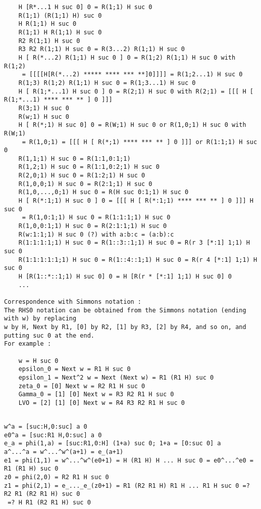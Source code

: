 \documentclass[10pt]{article}
\begin{document}
\begin{verbatim}
    H [R*...1 H suc 0] 0 = R(1;1) H suc 0
    R(1;1) (R(1;1) H) suc 0
    H R(1;1) H suc 0
    R(1;1) H R(1;1) H suc 0
    R2 R(1;1) H suc 0
    R3 R2 R(1;1) H suc 0 = R(3...2) R(1;1) H suc 0
    H [ R(*...2) R(1;1) H suc 0 ] 0 = R(1;2) R(1;1) H suc 0 with R(1;2) 
     = [[[[H[R(*...2) ***** **** *** **]0]]]] = R(1;2...1) H suc 0
    R(1;3) R(1;2) R(1;1) H suc 0 = R(1;3...1) H suc 0
    H [ R(1;*...1) H suc 0 ] 0 = R(2;1) H suc 0 with R(2;1) = [[[ H [ R(1;*...1) **** *** ** ] 0 ]]]
    R(3;1) H suc 0
    R(w;1) H suc 0
    H [ R(*;1) H suc 0] 0 = R(W;1) H suc 0 or R(1,0;1) H suc 0 with R(W;1) 
     = R(1,0;1) = [[[ H [ R(*;1) **** *** ** ] 0 ]]] or R(1:1;1) H suc 0
    R(1,1;1) H suc 0 = R(1:1,0:1;1)
    R(1,2;1) H suc 0 = R(1:1,0:2;1) H suc 0
    R(2,0;1) H suc 0 = R(1:2;1) H suc 0
    R(1,0,0;1) H suc 0 = R(2:1;1) H suc 0
    R(1,0,...,0;1) H suc 0 = R(H suc 0:1;1) H suc 0
    H [ R(*:1;1) H suc 0 ] 0 = [[[ H [ R(*:1;1) **** *** ** ] 0 ]]] H suc 0 
     = R(1,0:1;1) H suc 0 = R(1:1:1;1) H suc 0
    R(1,0,0:1;1) H suc 0 = R(2:1:1;1) H suc 0
    R(w:1:1;1) H suc 0 (?) with a:b:c = (a:b):c
    R(1:1:1:1;1) H suc 0 = R(1::3::1;1) H suc 0 = R(r 3 [*:1] 1;1) H suc 0
    R(1:1:1:1:1;1) H suc 0 = R(1::4::1;1) H suc 0 = R(r 4 [*:1] 1;1) H suc 0
    H [R(1::*::1;1) H suc 0] 0 = H [R(r * [*:1] 1;1) H suc 0] 0
    ... 

Correspondence with Simmons notation :
The RHS0 notation can be obtained from the Simmons notation (ending with w) by replacing 
w by H, Next by R1, [0] by R2, [1] by R3, [2] by R4, and so on, and putting suc 0 at the end.
For example :

    w = H suc 0
    epsilon_0 = Next w = R1 H suc 0
    epsilon_1 = Next^2 w = Next (Next w) = R1 (R1 H) suc 0
    zeta_0 = [0] Next w = R2 R1 H suc 0
    Gamma_0 = [1] [0] Next w = R3 R2 R1 H suc 0
    LVO = [2] [1] [0] Next w = R4 R3 R2 R1 H suc 0 

\end{verbatim}

\begin{verbatim}

w^a = [suc:H,0:suc] a 0
e0^a = [suc:R1 H,0:suc] a 0
e_a = phi(1,a) = [suc:R1,0:H] (1+a) suc 0; 1+a = [0:suc 0] a
a^...^a = w^...^w^(a+1) = e_(a+1)
e1 = phi(1,1) = w^...^w^(e0+1) = H (R1 H) H ... H suc 0 = e0^...^e0 = R1 (R1 H) suc 0
z0 = phi(2,0) = R2 R1 H suc 0
z1 = phi(2,1) = e_..._e_(z0+1) = R1 (R2 R1 H) R1 H ... R1 H suc 0 =? R2 R1 (R2 R1 H) suc 0 
 =? H R1 (R2 R1 H) suc 0

\end{verbatim}
\end{document}
